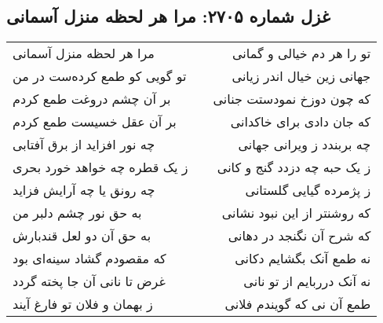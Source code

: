 \begin{center}
\section*{غزل شماره ۲۷۰۵: مرا هر لحظه منزل آسمانی}
\label{sec:2705}
\begin{longtable}{l p{0.5cm} r}
مرا هر لحظه منزل آسمانی
&&
تو را هر دم خیالی و گمانی
\\
تو گویی کو طمع کرده‌ست در من
&&
جهانی زین خیال اندر زیانی
\\
بر آن چشم دروغت طمع کردم
&&
که چون دوزخ نمودستت جنانی
\\
بر آن عقل خسیست طمع کردم
&&
که جان دادی برای خاکدانی
\\
چه نور افزاید از برق آفتابی
&&
چه بربندد ز ویرانی جهانی
\\
ز یک قطره چه خواهد خورد بحری
&&
ز یک حبه چه دزدد گنج و کانی
\\
چه رونق یا چه آرایش فزاید
&&
ز پژمرده گیایی گلستانی
\\
به حق نور چشم دلبر من
&&
که روشنتر از این نبود نشانی
\\
به حق آن دو لعل قندبارش
&&
که شرح آن نگنجد در دهانی
\\
که مقصودم گشاد سینه‌ای بود
&&
نه طمع آنک بگشایم دکانی
\\
غرض تا نانی آن جا پخته گردد
&&
نه آنک درربایم از تو نانی
\\
ز بهمان و فلان تو فارغ آیند
&&
طمع آن نی که گویندم فلانی
\\
\end{longtable}
\end{center}
